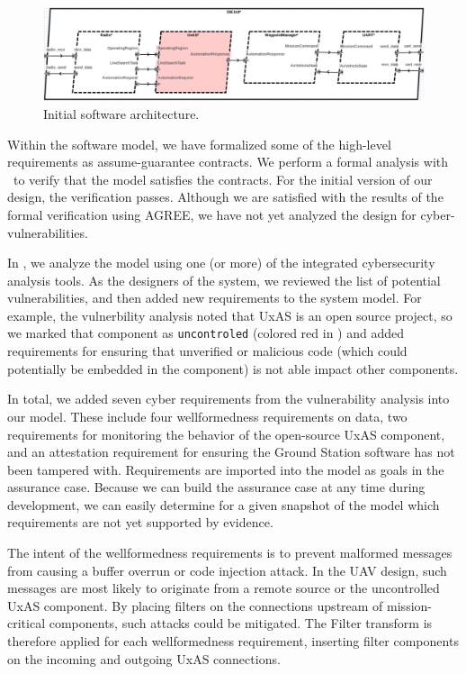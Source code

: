 \begin{figure}[h]
	\centering
	\includegraphics[width=1\columnwidth]{figs/sw-initial.png}
	\caption{Initial software architecture.}
	\label{fig:sw-initial}
\end{figure}

Within the software model, we have formalized some of the high-level requirements as assume-guarantee contracts.  We perform a formal analysis with \agr\ to verify that the model satisfies the contracts.  For the initial version of our design, the verification passes.
%
Although we are satisfied with the results of the formal verification using AGREE, we have not yet analyzed the design for cyber-vulnerabilities.

In \brfcs, we analyze the model using one (or more) of the integrated cybersecurity analysis tools.
As the designers of the system, we reviewed the list of potential vulnerabilities, and then added new requirements to the system model.
%
For example, the vulnerbility analysis noted that UxAS is an open source project, so we marked that component as \texttt{uncontroled} (colored red in ) and added requirements for ensuring that unverified or malicious code (which could potentially be embedded in the component) is not able impact other components.

In total, we added seven cyber requirements from the vulnerability analysis into our model.  These include four wellformedness requirements on data, two requirements for monitoring the behavior of the open-source UxAS component, and an attestation requirement for ensuring the Ground Station software has not been tampered with.  Requirements are imported into the model as goals in the assurance case.  Because we can build the assurance case at any time during development, we can easily determine for a given snapshot of the model which requirements are not yet supported by evidence.

The intent of the wellformedness requirements is to prevent
malformed messages from causing a buffer overrun or code injection
attack.  In the UAV design, such messages are most likely to originate
from a remote source or the uncontrolled UxAS component.  By placing
filters on the connections upstream of mission-critical components,
such attacks could be mitigated.  The Filter transform is therefore
applied for each wellformedness requirement, inserting filter
components on the incoming and outgoing UxAS connections.

